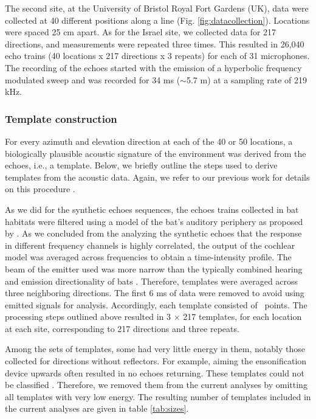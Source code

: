 \documentclass[preprint,5p]{elsarticle}
\begin{document}
The second site, at the University of Bristol Royal Fort Gardens (UK), data were collected at 40 different positions along a line (Fig. \ref{fig:datacollection}). Locations were spaced 25 cm apart. As for the Israel site, we collected data for 217 directions, and measurements were repeated three times. This resulted in 26,040 echo trains (40 locations x 217 directions x 3 repeats) for each of 31 microphones. The recording of the echoes started with the emission of a hyperbolic frequency modulated sweep and was recorded for 34 ms ($\sim$5.7 m) at a sampling rate of 219 kHz. 

\subsubsection{Template construction}

For every azimuth and elevation direction at each of the  40 or 50 locations, a biologically plausible acoustic signature of the environment was derived from the echoes, i.e., a template. Below, we briefly outline the steps used to derive templates from the acoustic data. Again, we refer to our previous work for details on this procedure \citep{Vanderelst2016}.

As we did for the synthetic echoes sequences, the echoes trains collected in bat habitats were filtered using a model of the bat's auditory periphery as proposed by \citet{Wiegrebe2008}. As we concluded from the analyzing the synthetic echoes that the response in different frequency channels is highly correlated, the output of the cochlear model was averaged across frequencies to obtain a time-intensity profile. The beam of the emitter used was more narrow than the typically combined hearing and emission directionality of bats \citep{Vanderelst2010a,Reijniers2010,Jakobsen2012}. Therefore, templates were averaged across three neighboring directions. The first 6 ms of data were removed to avoid using emitted signals for analysis. Accordingly, each template consisted of \pca\ points. The processing steps outlined above resulted in 3 $\times$ 217 templates, for each location at each site, corresponding to 217 directions and three repeats.

Among the sets of templates, some had very little energy in them, notably those collected for directions without reflectors. For example, aiming the ensonification device upwards often resulted in no echoes returning. These templates could not be classified \citep{Vanderelst2016}. Therefore, we removed them from the current analyses by omitting all templates with very low energy. The resulting number of templates included in the current analyses are given in table \ref{tab:sizes}.
\end{document}

